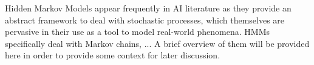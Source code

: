 \placeholder{}
Hidden Markov Models appear frequently in AI literature as they provide an abstract framework to deal with stochastic processes, which themselves are pervasive in their use as a tool to model real-world phenomena. HMMs specifically deal with Markov chains, ... A brief overview of them will be provided here in order to provide some context for later discussion.